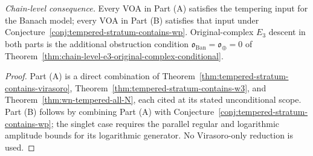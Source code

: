 \begin{corollary}
\emph{Chain-level consequence.} Every VOA in Part (A) satisfies the
tempering input for the Banach model; every VOA in Part (B) satisfies
that input under Conjecture~\ref{conj:tempered-stratum-contains-wp}.
Original-complex $E_3$ descent in both parts is the additional
obstruction condition
$\mathfrak{o}_{\mathrm{Ban}}=\mathfrak{o}_{\oplus}=0$ of
Theorem~\ref{thm:chain-level-e3-original-complex-conditional}.
\end{corollary}

\begin{proof}
Part (A) is a direct combination of
Theorem~\ref{thm:tempered-stratum-contains-virasoro},
Theorem~\ref{thm:tempered-stratum-contains-w3}, and
Theorem~\ref{thm:wn-tempered-all-N}, each cited at its stated
unconditional scope. Part (B) follows by combining Part (A) with
Conjecture~\ref{conj:tempered-stratum-contains-wp}; the singlet case
requires the parallel regular and logarithmic amplitude bounds for its
logarithmic generator. No Virasoro-only reduction is used.
\end{proof}


